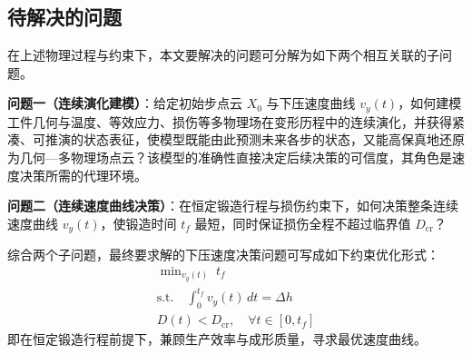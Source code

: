 \subsection{待解决的问题}
在上述物理过程与约束下，本文要解决的问题可分解为如下两个相互关联的子问题。

\textbf{问题一（连续演化建模）}：给定初始步点云 $X_0$ 与下压速度曲线 $v_y(t)$，如何建模工件几何与温度、等效应力、损伤等多物理场在变形历程中的连续演化，并获得紧凑、可推演的状态表征，使模型既能由此预测未来各步的状态，又能高保真地还原为几何—多物理场点云？该模型的准确性直接决定后续决策的可信度，其角色是速度决策所需的代理环境。
    
\textbf{问题二（连续速度曲线决策）}：在恒定锻造行程与损伤约束下，如何决策整条连续速度曲线 $v_y(t)$，使锻造时间 $t_f$ 最短，同时保证损伤全程不超过临界值 $D_{\text{cr}}$？

综合两个子问题，最终要求解的下压速度决策问题可写成如下约束优化形式：
\begin{equation}
\begin{gathered}
\min\nolimits_{v_y(t)} \; t_f \\
\text{s.t.} \quad \int_{0}^{t_f} v_y(t)\,dt = \Delta h \\
D(t) < D_{\text{cr}}, \quad \forall t \in [0, t_f]
\end{gathered}
\label{equ:model}
\end{equation}
即在恒定锻造行程前提下，兼顾生产效率与成形质量，寻求最优速度曲线。
